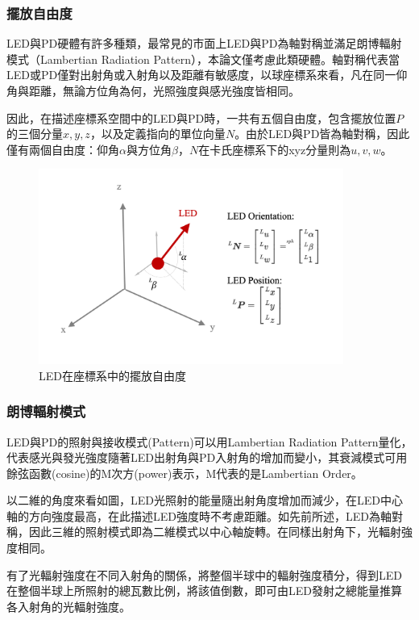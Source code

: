         \subsubsection{擺放自由度}
        LED與PD硬體有許多種類，最常見的市面上LED與PD為軸對稱並滿足朗博輻射模式（Lambertian Radiation Pattern），本論文僅考慮此類硬體。軸對稱代表當LED或PD僅對出射角或入射角以及距離有敏感度，以球座標系來看，凡在同一仰角與距離，無論方位角為何，光照強度與感光強度皆相同。

        因此，在描述座標系空間中的LED與PD時，一共有五個自由度，包含擺放位置$P$的三個分量$x,y,z$，以及定義指向的單位向量$N$。由於LED與PD皆為軸對稱，因此僅有兩個自由度：仰角$\alpha$與方位角$\beta$，$N$在卡氏座標系下的xyz分量則為$u,v,w$。


        \begin{figure}[ht]
            \centering
            \includegraphics[width=10cm]{ch2pic/LED_config.png}
            \caption{LED在座標系中的擺放自由度}
            \label{pic:led_config}
        \end{figure}

        \subsubsection{朗博輻射模式}

        LED與PD的照射與接收模式(Pattern)可以用Lambertian Radiation Pattern量化，代表感光與發光強度隨著LED出射角與PD入射角的增加而變小，其衰減模式可用餘弦函數(cosine)的M次方(power)表示，M代表的是Lambertian Order。

        以二維的角度來看如圖，LED光照射的能量隨出射角度增加而減少，在LED中心軸的方向強度最高，在此描述LED強度時不考慮距離。如先前所述，LED為軸對稱，因此三維的照射模式即為二維模式以中心軸旋轉。在同樣出射角下，光輻射強度相同。
        
        有了光輻射強度在不同入射角的關係，將整個半球中的輻射強度積分，得到LED在整個半球上所照射的總瓦數比例，將該值倒數，即可由LED發射之總能量推算各入射角的光輻射強度。


